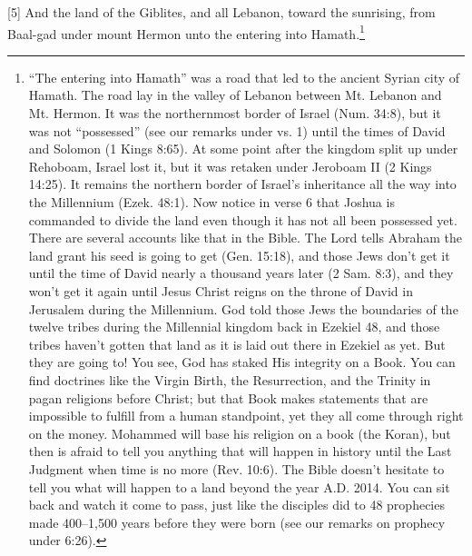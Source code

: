 [5] \textcolor[rgb]{0.00,0.00,1.00}{And the land of the Giblites, and all Lebanon, toward the sunrising, from Baal-gad under mount Hermon unto the entering into Hamath.}\footnote{“The entering into Hamath” was a road that led to the ancient Syrian city of Hamath. The road lay in the valley of Lebanon between Mt. Lebanon and Mt. Hermon. It was the northernmost border of Israel (Num. 34:8), but it was not “possessed” (see our remarks under vs. 1) until the times of David and Solomon (1 Kings 8:65). At some point after the kingdom split up under Rehoboam, Israel lost it, but it was retaken under Jeroboam II (2 Kings 14:25). It remains the northern border of Israel’s inheritance all the way into the Millennium (Ezek. 48:1). Now notice in verse 6 that Joshua is commanded to divide the land even though it has not all been possessed yet. There are several accounts like that in the Bible. The Lord tells Abraham the land grant his seed is going to get (Gen. 15:18), and those Jews don’t get it until the time of David nearly a thousand years later (2 Sam. 8:3), and they won’t get it again until Jesus Christ reigns on the throne of David in Jerusalem during the Millennium. God told those Jews the boundaries of the twelve tribes during the Millennial kingdom back in Ezekiel 48, and those tribes haven’t gotten that land as it is laid out there in Ezekiel as yet. But they are going to! You see, God has staked His integrity on a Book. You can find doctrines like the Virgin Birth, the Resurrection, and the Trinity in pagan religions before Christ; but that Book makes statements that are impossible to fulfill from a human standpoint, yet they all come through right on the money. Mohammed will base his religion on a book (the Koran), but then is afraid to tell you anything that will happen in history until the Last Judgment when time is no more (Rev. 10:6). The Bible doesn’t hesitate to tell you what will happen to a land beyond the year A.D. 2014. You can sit back and watch it come to pass, just like the disciples did to 48 prophecies made 400–1,500 years before they were born (see our remarks on prophecy under 6:26).}
